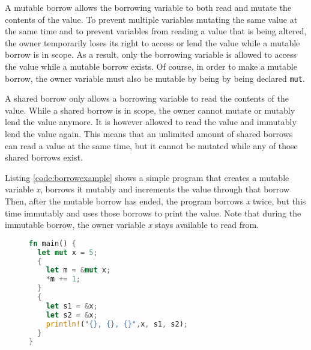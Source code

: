 A mutable borrow allows the borrowing variable to both read and mutate the contents of the value.
To prevent multiple variables mutating the same value at the same time and to prevent variables from reading a value that is being altered, the owner temporarily loses its right to access or lend the value while a mutable borrow is in scope.
As a result, only the borrowing variable is allowed to access the value while a mutable borrow exists.
Of course, in order to make a mutable borrow, the owner variable must also be mutable by being by being declared \texttt{mut}.

A shared borrow only allows a borrowing variable to read the contents of the value.
While a shared borrow is in scope, the owner cannot mutate or mutably lend the value anymore.
It is however allowed to read the value and immutably lend the value again.
This means that an unlimited amount of shared borrows can read a value at the same time, but it cannot be mutated while any of those shared borrows exist.

Listing \ref{code:borrowexample} shows a simple program that creates a mutable variable \textit{x}, borrows it mutably and increments the value through that borrow 
Then, after the mutable borrow has ended, the program borrows \textit{x} twice, but this time immutably and uses those borrows to print the value. Note that during the immutable borrow, the owner variable \textit{x} stays available to read from.

\begin{figure}[h]
\begin{lstlisting}[language=Rust,frame=single,caption=Borrowing an integer,label=code:borrowexample]
fn main() {
  let mut x = 5;
  {
    let m = &mut x;
    *m += 1;
  }
  {
    let s1 = &x;
    let s2 = &x;
    println!("{}, {}, {}",x, s1, s2);
  }
}
\end{lstlisting}
\end{figure}

